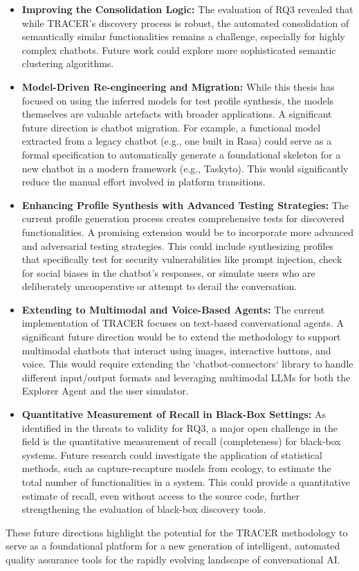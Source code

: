 \begin{itemize}
    \item \textbf{Improving the Consolidation Logic:}
      The evaluation of RQ3 revealed that while TRACER's discovery process is robust,
      the automated consolidation of semantically similar functionalities remains a challenge,
      especially for highly complex chatbots.
      Future work could explore more sophisticated semantic clustering algorithms. 
    
    \item \textbf{Model-Driven Re-engineering and Migration:}
      While this thesis has focused
      on using the inferred models for test profile synthesis,
      the models themselves are valuable artefacts with broader applications.
      A significant future direction is chatbot migration.
      For example, a functional model
      extracted from a legacy chatbot (e.g., one built in Rasa)
      could serve as a formal specification
      to automatically generate a foundational skeleton
      for a new chatbot in a modern framework (e.g., Taskyto).
      This would significantly reduce
      the manual effort involved in platform transitions.

    \item \textbf{Enhancing Profile Synthesis with Advanced Testing Strategies:}
      The current profile generation process creates comprehensive tests for discovered functionalities.
      A promising extension would be to incorporate more advanced and adversarial testing strategies.
      This could include synthesizing profiles that specifically test for security vulnerabilities like prompt injection,
      check for social biases in the chatbot's responses,
      or simulate users who are deliberately uncooperative or attempt to derail the conversation.

    \item \textbf{Extending to Multimodal and Voice-Based Agents:}
      The current implementation of \ac{TRACER} focuses on text-based conversational agents.
      A significant future direction would be
      to extend the methodology to support multimodal chatbots that interact using images, interactive buttons, and voice.
      This would require extending the `chatbot-connectors` library
      to handle different input/output formats
      and leveraging multimodal \acp{LLM} for both the Explorer Agent and the user simulator.

    \item \textbf{Quantitative Measurement of Recall in Black-Box Settings:}
      As identified in the threats to validity for RQ3,
      a major open challenge in the field is the quantitative measurement of recall (completeness) for black-box systems.
      Future research could investigate the application of statistical methods,
      such as capture-recapture models from ecology,
      to estimate the total number of functionalities in a system.
      This could provide a quantitative estimate of recall,
      even without access to the source code,
      further strengthening the evaluation of black-box discovery tools.
\end{itemize}

These future directions highlight the potential for the \ac{TRACER} methodology
to serve as a foundational platform
for a new generation of intelligent, automated quality assurance tools
for the rapidly evolving landscape of conversational AI.


